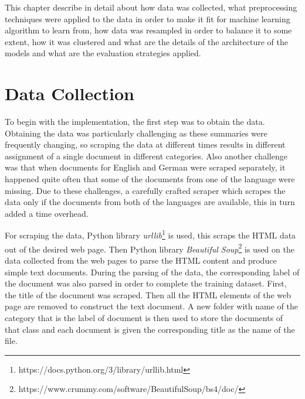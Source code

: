 \label{ch:implementation}

This chapter describe in detail about how data was collected, what preprocessing techniques were applied to the data in order to make it fit for machine learning algorithm to learn from, how data was resampled in order to balance it to some extent, how it was clustered and what are the details of the architecture of the models and what are the evaluation strategies applied.

\section{Data Collection}

To begin with the implementation, the first step was to obtain the data. Obtaining the data was particularly  challenging as these summaries were frequently changing, so scraping the data at different times results in different assignment of a single document in different categories. Also another challenge was that when documents for English and German were scraped separately, it happened quite often that some of the documents from one of the language were missing. Due to these challenges, a carefully crafted scraper which scrapes the data only if the documents from both of the languages are available, this in turn added a time overhead.

For scraping the data, Python library \textit{urllib}\footnote{https://docs.python.org/3/library/urllib.html} is used, this scraps the HTML data out of the desired web page. Then Python library \textit{Beautiful Soup}\footnote{https://www.crummy.com/software/BeautifulSoup/bs4/doc/} is used on the data collected from the web pages to parse the HTML content and produce simple text documents. During the parsing of the data, the corresponding label of the document was also parsed in order to complete the training dataset. First, the title of the document was scraped. Then all the HTML elements of the web page are removed to construct the text document. A new folder with name of the category that is the label of document is then used to store the documents of that class and each document is given the corresponding title as the name of the file.

